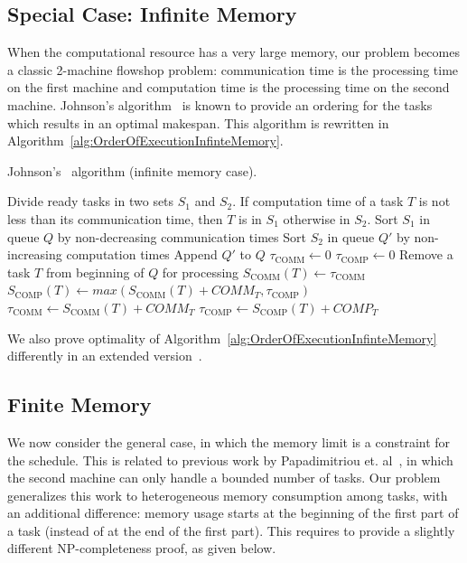 \documentclass[sigconf]{acmart}
\newcommand{\scomm}{\ensuremath{{S}_{\text{COMM}}}}
\newcommand{\scomp}{\ensuremath{{S}_{\text{COMP}}}}
\begin{document}
	\subsection{Special Case: Infinite Memory}
	
	When the computational resource has a very large memory, our problem
	becomes a classic 2-machine flowshop problem: communication time is
	the processing time on the first machine and computation time is the
	processing time on the second machine. Johnson's
	algorithm~\cite{johnson} is known to provide an ordering for the tasks
	which results in an optimal makespan. This algorithm is rewritten in
	Algorithm~\ref{alg:OrderOfExecutionInfinteMemory}.
	
	\vspace*{-0.25cm}
	\begin{algorithm}
		\caption{\label{alg:OrderOfExecutionInfinteMemory}Johnson's~\cite{johnson} algorithm (infinite memory case).}
		\begin{algorithmic}[1]
			\STATE Divide ready tasks in two sets $S_1$ and $S_2$. If computation time of a task $T$ is not less than its communication time, then $T$ is in $S_1$ otherwise in $S_2$.
			\STATE Sort $S_1$ in queue $Q$ by non-decreasing communication times
			\STATE Sort $S_2$ in queue $Q'$ by non-increasing computation times
			\STATE Append $Q'$ to $Q$
			\STATE $\tau_{\text{COMM}} \gets 0$ \hfill{}
			\STATE $\tau_{\text{COMP}} \gets 0$\hfill {}
			\STATE Remove a task $T$ from beginning of $Q$ for processing
			\STATE $\scomm(T) \gets \tau_{\text{COMM}}$
			\STATE $\scomp(T) \gets max(\scomm(T) + COMM_T, \tau_{\text{COMP}})$
			\STATE $\tau_{\text{COMM}} \gets \scomm(T) + COMM_T$
			\STATE $\tau_{\text{COMP}} \gets \scomp(T) + COMP_T$
			\ENDWHILE
		\end{algorithmic}
	\end{algorithm}
	\vspace*{-0.35cm}
	We also prove optimality of Algorithm~\ref{alg:OrderOfExecutionInfinteMemory} differently in an extended version~\cite{extendedVersion}.
	\subsection{Finite Memory}
	
	We now consider the general case, in which the memory limit is a
	constraint for the schedule. This is related to previous work by
	Papadimitriou et. al~\cite{Papadimitriou:1980:FSL:322203.322213}, in which the second machine
	can only handle a bounded number of tasks. Our problem generalizes this
	work to heterogeneous memory consumption among tasks, with an
	additional difference: memory usage starts at the beginning of the
	first part of a task (instead of at the end of the first part). This
	requires to provide a slightly different NP-completeness proof, as
	given below.
	
\end{document}
